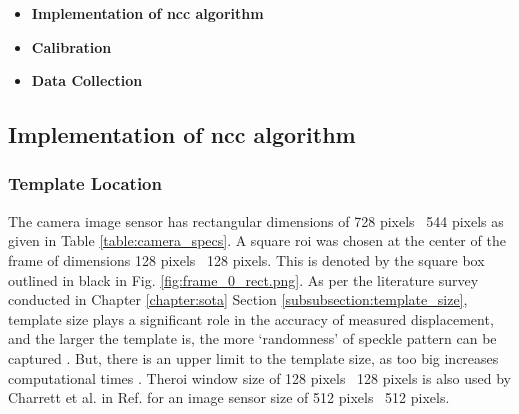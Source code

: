 \begin{itemize}
    \item \textbf{Implementation of \gls{ncc} algorithm}
    \item \textbf{Calibration}
    \item \textbf{Data Collection}
\end{itemize}





\subsection{Implementation of \gls{ncc} algorithm}\label{section:code_logic}
    \subsubsection*{Template Location}
        The camera image sensor has rectangular dimensions of 728 pixels \times \ 544 pixels as given in Table \ref{table:camera_specs}. A square \gls{roi} was chosen at the center of the frame of dimensions 128 pixels \times \ 128 pixels. This is denoted by the square box outlined in black in Fig. \ref{fig:frame_0_rect.png}. As per the literature survey conducted in Chapter \ref{chapter:sota} Section \ref{subsubsection:template_size}, template size plays a significant role in the accuracy of measured displacement, and the larger the template is, the more `randomness' of speckle pattern can be captured \cite{pan_subset}. But, there is an upper limit to the template size, as too big increases computational times \cite{yaofeng}. The\gls{roi} window size of 128 pixels \times \ 128 pixels is also used by Charrett et al. in Ref. \cite{charrett_2018} for an image sensor size of 512 pixels \times \ 512 pixels.

